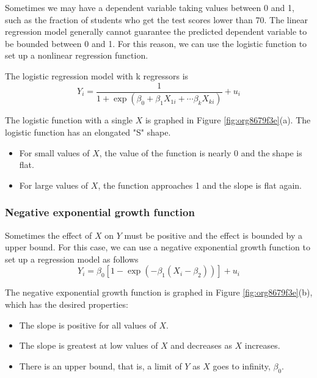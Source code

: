\documentclass[a4paper,11pt]{article}
\begin{document}
Sometimes we may have a dependent variable taking values between 0 and
1, such as the fraction of students who get the test scores lower
than 70. The linear regression model generally cannot guarantee the
predicted dependent variable to be bounded between 0 and 1. For this
reason, we can use the logistic function to set up a nonlinear
regression function.

The logistic regression model with k regressors is
\begin{equation}
\label{eq:logistic}
Y_i = \frac{1}{1 + \exp(\beta_0 + \beta_1 X_{1i} + \cdots \beta_k X_{ki})} + u_i
\end{equation}

The logistic function with a single \(X\) is graphed in Figure \ref{fig:org8679f3e}(a). The
logistic function has an elongated "S" shape.
\begin{itemize}
\item For small values of \(X\), the value of the function is nearly 0 and
the shape is flat.
\item For large values of \(X\), the function approaches 1 and the slope is
flat again.
\end{itemize}

\subsubsection*{Negative exponential growth function}
\label{sec:org7ee47fa}

Sometimes the effect of \(X\) on \(Y\) must be positive and the effect is
bounded by a upper bound. For this case, we can use a negative
exponential growth function to set up a regression model as follows
\begin{equation}
\label{eq:neg-exp}
Y_i = \beta_0 [1-\exp(-\beta_1(X_i - \beta_2))] + u_i
\end{equation}

The negative exponential growth function is graphed in Figure
\ref{fig:org8679f3e}(b), which has the desired properties:
\begin{itemize}
\item The slope is positive for all values of \(X\).
\item The slope is greatest at low values of \(X\) and decreases as \(X\)
increases.
\item There is an upper bound, that is, a limit of \(Y\) as \(X\) goes to
infinity, \(\beta_0\).
\end{itemize}
\end{document}
